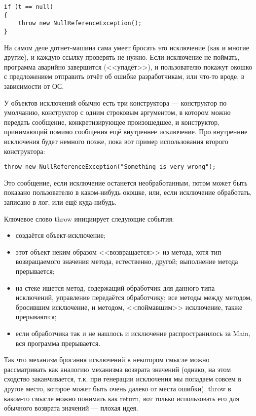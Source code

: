 \documentclass{../../text-style}
\begin{document}
\begin{verbatim}
if (t == null)
{
    throw new NullReferenceException();
}
\end{verbatim}

На самом деле дотнет-машина сама умеет бросать это исключение (как и многие другие), и каждую ссылку проверять не нужно. Если исключение не поймать, программа аварийно завершится (<<упадёт>>), и пользователю покажут окошко с предложением отправить отчёт об ошибке разработчикам, или что-то вроде, в зависимости от ОС. 

У объектов исключений обычно есть три конструктора --- конструктор по умолчанию, конструктор с одним строковым аргументом, в котором можно передать сообщение, конкретизирующее произошедшее, и конструктор, принимающий помимо сообщения ещё внутреннее исключение. Про внутренние исключения будет немного позже, пока вот пример использования второго конструктора:

\begin{verbatim}
throw new NullReferenceException("Something is very wrong");
\end{verbatim}

Это сообщение, если исключение останется необработанным, потом может быть показано пользователю в каком-нибудь окошке, или, если исключение обработать, записано в лог, или ещё куда-нибудь.

Ключевое слово throw инициирует следующие события:

\begin{itemize}
    \item создаётся объект-исключение;
    \item этот объект неким образом <<возвращается>> из метода, хотя тип возвращаемого значения метода, естественно, другой; выполнение метода прерывается;
    \item на стеке ищется метод, содержащий обработчик для данного типа исключений, управление передаётся обработчику; все методы между методом, бросившим исключение, и методом, <<поймавшим>> исключение, также прерываются;
    \item если обработчика так и не нашлось и исключение распространилось за Main, вся программа прерывается.
\end{itemize}

Так что механизм бросания исключений в некотором смысле можно рассматривать как аналогию механизма возврата значений (однако, на этом сходство заканчивается, т.к. при генерации исключения мы попадаем совсем в другое место, которое может быть очень далеко от места ошибки). throw в каком-то смысле можно понимать как return, вот только использовать его для обычного возврата значений --- плохая идея.
\end{document}
